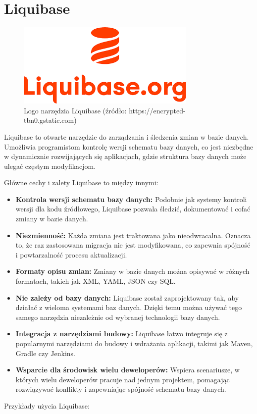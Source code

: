 \section{Liquibase}
\begin{figure}[h]
    \centering
    \includegraphics[width=0.4\linewidth]{./img/liquibase.png}
    \caption{Logo narzędzia Liquibase (źródło: https://encrypted-tbn0.gstatic.com)}
    \label{fig:Liquibase}
\end{figure}
Liquibase to otwarte narzędzie do zarządzania i śledzenia zmian w bazie danych. Umożliwia programistom kontrolę wersji schematu bazy danych, co jest niezbędne w dynamicznie rozwijających się aplikacjach, gdzie struktura bazy danych może ulegać częstym modyfikacjom.

Główne cechy i zalety Liquibase to między innymi:

\begin{itemize}
\item \textbf{Kontrola wersji schematu bazy danych:} Podobnie jak systemy kontroli wersji dla kodu źródłowego, Liquibase pozwala śledzić, dokumentować i cofać zmiany w bazie danych.

\item \textbf{Niezmienność:} Każda zmiana jest traktowana jako nieodwracalna. Oznacza to, że raz zastosowana migracja nie jest modyfikowana, co zapewnia spójność i powtarzalność procesu aktualizacji.

\item \textbf{Formaty opisu zmian:} Zmiany w bazie danych można opisywać w różnych formatach, takich jak XML, YAML, JSON czy SQL.

\item \textbf{Nie zależy od bazy danych:} Liquibase został zaprojektowany tak, aby działać z wieloma systemami baz danych. Dzięki temu można używać tego samego narzędzia niezależnie od wybranej technologii bazy danych.

\item \textbf{Integracja z narzędziami budowy:} Liquibase łatwo integruje się z popularnymi narzędziami do budowy i wdrażania aplikacji, takimi jak Maven, Gradle czy Jenkins.

\item \textbf{Wsparcie dla środowisk wielu deweloperów:} Wspiera scenariusze, w których wielu deweloperów pracuje nad jednym projektem, pomagając rozwiązywać konflikty i zapewniając spójność schematu bazy danych.
\end{itemize}
Przykłady użycia Liquibase:

